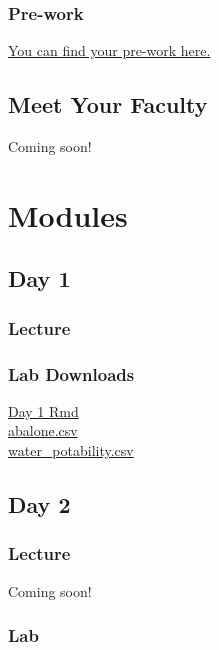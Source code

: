 \documentclass[
]{book}
\begin{document}
\section{Pre-work}\label{pre-work}

\href{https://docs.google.com/forms/d/e/1FAIpQLSeAV5gz7dADoF7JQCih9yOF7GP0IwOIxDK1ClG3jxB9yiJaQA/viewform?usp=dialog}{You can find your pre-work here.}

\chapter{Meet Your Faculty}\label{meet-your-faculty}

Coming soon!

\part{Modules}\label{part-modules}

\chapter{Day 1}\label{day-1}

\section{Lecture}\label{lecture}

\section{Lab Downloads}\label{lab-downloads}

\href{https://drive.google.com/file/d/1yfOvH9V7Bfv10zSSZn7YVtd-onhiR1zl/view?usp=sharing}{Day 1 Rmd}\\
\href{https://drive.google.com/file/d/1taCATRfEQxTA0sUqw1dBgX9812DUSMZq/view?usp=drive_link}{abalone.csv}\\
\href{https://drive.google.com/file/d/1ZOTY43EyPoNBltGedDfOdsKzq9HSA77e/view?usp=sharing}{water\_potability.csv}

\chapter{Day 2}\label{day-2}

\section{Lecture}\label{lecture-1}

Coming soon!

\section{Lab}\label{lab}

  
\end{document}
